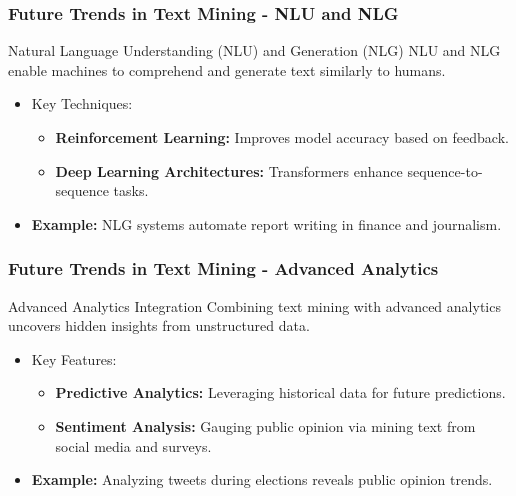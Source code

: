 \documentclass[aspectratio=169]{beamer}
\begin{document}
\begin{frame}[fragile]
    \frametitle{Future Trends in Text Mining - NLU and NLG}
    \begin{block}{Natural Language Understanding (NLU) and Generation (NLG)}
        NLU and NLG enable machines to comprehend and generate text similarly to humans.
    \end{block}
    \begin{itemize}
        \item Key Techniques:
        \begin{itemize}
            \item \textbf{Reinforcement Learning:} Improves model accuracy based on feedback.
            \item \textbf{Deep Learning Architectures:} Transformers enhance sequence-to-sequence tasks.
        \end{itemize}
        \item \textbf{Example:} NLG systems automate report writing in finance and journalism.
    \end{itemize}
\end{frame}

\begin{frame}[fragile]
    \frametitle{Future Trends in Text Mining - Advanced Analytics}
    \begin{block}{Advanced Analytics Integration}
        Combining text mining with advanced analytics uncovers hidden insights from unstructured data.
    \end{block}
    \begin{itemize}
        \item Key Features:
        \begin{itemize}
            \item \textbf{Predictive Analytics:} Leveraging historical data for future predictions.
            \item \textbf{Sentiment Analysis:} Gauging public opinion via mining text from social media and surveys.
        \end{itemize}
        \item \textbf{Example:} Analyzing tweets during elections reveals public opinion trends.
    \end{itemize}
\end{frame}
\end{document}

